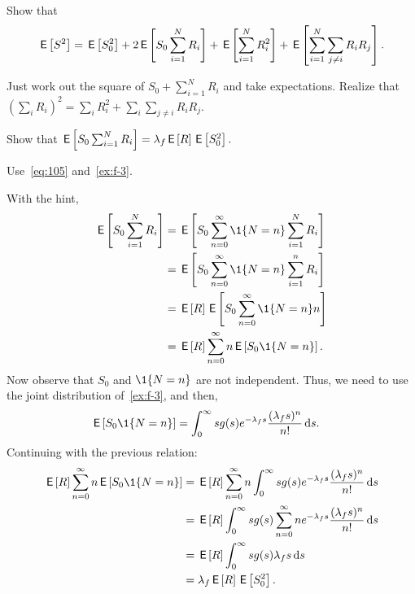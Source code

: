\begin{exercise}
Show that 
\begin{equation*}
 \,\mathsf{E}\left[S^2\right] = \,\mathsf{E}\left[S_0^2\right] + 2\,\mathsf{E}\left[S_0 \sum_{i=1}^N R_i\right] + \,\mathsf{E}\left[\sum_{i=1}^N R_i^2\right] + \,\mathsf{E}\left[\sum_{i=1}^N \sum_{j\neq i} R_i R_j\right].
\end{equation*}
\begin{solution}
 Just work out the square of $S_0+\sum_{i=1}^N R_i$ and take expectations. Realize that $(\sum_i R_i)^2 = \sum_i R_i^2 + \sum_i\sum_{j\neq i} R_i R_j$. 
\end{solution}
\end{exercise}


\begin{extra}
Show that  $\,\mathsf{E}\left[S_0 \sum_{i=1}^N R_i\right] = \lambda_f \,\mathsf{E}\left[R\right] \,\mathsf{E}\left[S_0^2\right]. $
\begin{hint}
  Use~\cref{eq:105} and~\cref{ex:f-3}.
\end{hint}
\begin{solution}
With the hint,
  \begin{align*}
    \E{S_0 \sum_{i=1}^N R_i}
    &=   \E{S_0 \sum_{n=0}^\infty \1{N=n} \sum_{i=1}^N R_i} \\
    &=   \E{S_0 \sum_{n=0}^\infty \1{N=n} \sum_{i=1}^n R_i} \\
    &=   \E R \E{S_0 \sum_{n=0}^\infty \1{N=n} n } \\
    &=   \E R \sum_{n=0}^\infty n \E{S_0 \1{N=n}}.
  \end{align*}
  Now observe that $S_0$ and  $\1{N=n}$ are not independent. Thus, we need to use the joint distribution of~\cref{ex:f-3}, and then,
  \begin{align*}
    \E{S_0 \1{N=n}}
    &=  \int_0^\infty s  g(s) e^{-\lambda_f s} \frac{(\lambda_f s)^n}{n!} \d s.
  \end{align*}
  Continuing with the previous relation:
  \begin{align*}
    \E R \sum_{n=0}^\infty n \E{S_0 \1{N=n}}
    & =  \E R \sum_{n=0}^\infty n \int_0^\infty s  g(s) e^{-\lambda_f s} \frac{(\lambda_f s)^n}{n!} \d s \\
    & =  \E R \int_0^\infty s  g(s) \sum_{n=0}^\infty n e^{-\lambda_f s} \frac{(\lambda_f s)^n}{n!} \d s \\
    & =  \E R \int_0^\infty s  g(s) \lambda_f s \d s \\
    & =  \lambda_f \E R \E{S_0^2}.
  \end{align*}
\end{solution}
\end{extra}

